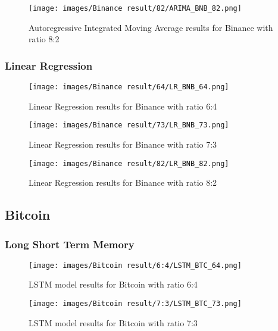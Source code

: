 \documentclass{ieeeojies}
\begin{document}
\begin{figure}[H]
  \centering
\texttt{[image: images/Binance result/82/ARIMA\_BNB\_82.png]}
  \caption{Autoregressive Integrated Moving Average results for Binance with ratio 8:2}
  \label{fig:arima_bn_82}
\end{figure}

\subsubsection{Linear Regression}
\begin{figure}[H]
  \centering
\texttt{[image: images/Binance result/64/LR\_BNB\_64.png]}\\
  \caption{Linear Regression results for Binance with ratio 6:4}
  \label{fig:arima_bn_64}
\end{figure}

\begin{figure}[H]
  \centering
\texttt{[image: images/Binance result/73/LR\_BNB\_73.png]}\\
  \caption{Linear Regression results for Binance with ratio 7:3}
  \label{fig:arima_bn_73}
\end{figure}

\begin{figure}[H]
  \centering
\texttt{[image: images/Binance result/82/LR\_BNB\_82.png]}
  \caption{Linear Regression results for Binance with ratio 8:2}
  \label{fig:arima_bn_82}
\end{figure}



\subsection{Bitcoin}
\subsubsection{Long Short Term Memory}

\begin{figure}[H]
  \centering
  \texttt{[image: images/Bitcoin result/6:4/LSTM\_BTC\_64.png]}
  \caption{LSTM model results for Bitcoin with ratio 6:4}
  \label{fig:lstm_btc_64}
\end{figure}

\begin{figure}[H]
  \centering
  \texttt{[image: images/Bitcoin result/7:3/LSTM\_BTC\_73.png]}
  \caption{LSTM model results for Bitcoin with ratio 7:3}
  \label{fig:lstm_btc_73}
\end{figure}
\end{document}
